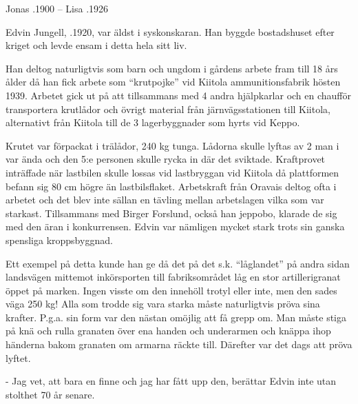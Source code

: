 Jonas .1900  --   Lisa .1926




Edvin Jungell, .1920, var äldst i syskonskaran. Han byggde bostadshuset efter kriget och levde ensam i detta hela sitt liv.


Han deltog naturligtvis som barn och ungdom i gårdens arbete fram till 18 års ålder då han fick arbete som ``krutpojke'' vid Kiitola ammunitionsfabrik hösten 1939. Arbetet gick ut på att tillsammans med 4 andra hjälpkarlar och en chaufför transportera krutlådor och övrigt material från järnvägsstationen till Kiitola, alternativt från Kiitola till de 3 lagerbyggnader som hyrts vid Keppo.

Krutet var förpackat i trälådor, 240 kg tunga. Lådorna skulle lyftas av 2 man i var ända och den 5:e personen skulle rycka in där det sviktade. Kraftprovet inträffade när lastbilen skulle lossas vid lastbryggan vid Kiitola då plattformen befann sig 80 cm högre än lastbilsflaket. Arbetskraft från Oravais deltog ofta i arbetet och det blev inte sällan en tävling mellan arbetslagen vilka som var starkast. Tillsammans med Birger Forslund, också han jeppobo, klarade de sig med den äran i konkurrensen. Edvin var nämligen mycket stark trots sin ganska spensliga kroppsbyggnad.

Ett exempel på detta kunde han ge då det på det s.k. ``låglandet'' på andra sidan landsvägen mittemot inkörsporten till fabriksområdet låg en stor artillerigranat öppet på marken. Ingen visste om den innehöll trotyl eller inte, men den sades väga 250 kg! Alla som trodde sig vara starka måste naturligtvis pröva sina krafter. P.g.a. sin form var den nästan omöjlig att få grepp om. Man måste stiga på knä och rulla granaten över ena handen och underarmen och knäppa ihop händerna bakom granaten om armarna räckte till. Därefter var det dags att pröva lyftet.

- Jag vet, att bara en finne och jag har fått upp den, berättar Edvin inte utan stolthet 70 år senare.

